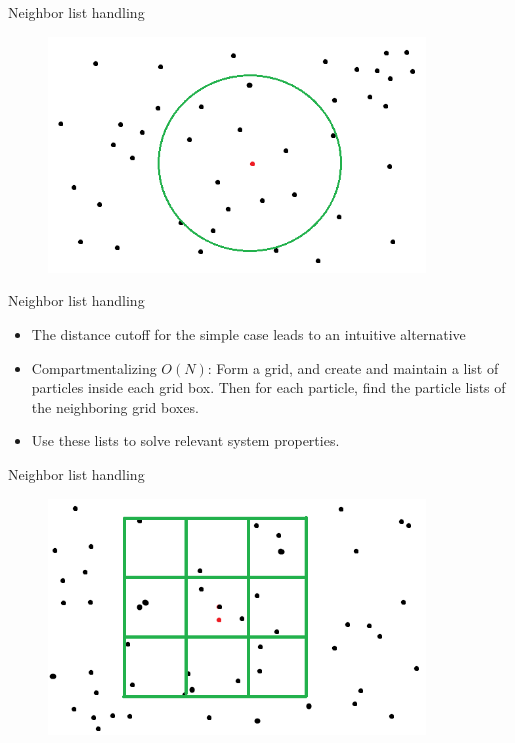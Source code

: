 \documentclass{beamer}
\begin{document}
\begin{frame}{Neighbor list handling}

\begin{figure}[!ht]
\begin{center}
\includegraphics[width=10cm]{N2.png} 

\end{center}
\end{figure}

\end{frame}


\begin{frame}{Neighbor list handling}
\begin{itemize}

\item The distance cutoff for the simple case leads to an intuitive alternative
\item Compartmentalizing  $O(N)$: Form a grid, and create and maintain a list of particles inside each grid box. Then for each particle, find the particle lists of the neighboring grid boxes.
\item Use these lists to solve relevant system properties.
\end{itemize}
\end{frame}

\begin{frame}{Neighbor list handling}

\begin{figure}[!ht]
\begin{center}
\includegraphics[width=10cm]{N.png} 

\end{center}
\end{figure}

\end{frame}
\end{document}
